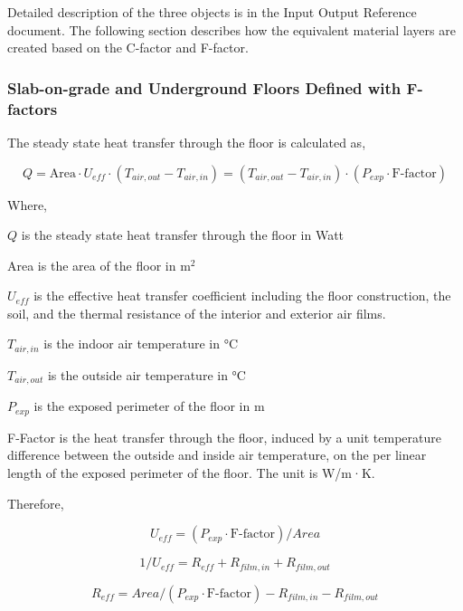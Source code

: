 Detailed description of the three objects is in the Input Output Reference document. The following section describes how the equivalent material layers are created based on the C-factor and F-factor.

\subsubsection{Slab-on-grade and Underground Floors Defined with F-factors}\label{slab-on-grade-and-underground-floors-defined-with-f-factors}

The steady state heat transfer through the floor is calculated as,

\begin{equation}
  Q = \text{Area} \cdot U_{eff} \cdot (T_{air,out} - T_{air,in}) = (T_{air,out} - T_{air,in}) \cdot (P_{exp} \cdot \text{F-factor})
\end{equation}

Where,

\(Q\) is the steady state heat transfer through the floor in Watt

Area is the area of the floor in m\(^{2}\)

\(U_{eff}\) is the effective heat transfer coefficient including the floor construction, the soil, and the thermal resistance of the interior and exterior air films.

\(T_{air,in}\) is the indoor air temperature in °C

\(T_{air,out}\) is the outside air temperature in °C

\(P_{exp}\) is the exposed perimeter of the floor in m

F-Factor is the heat transfer through the floor, induced by a unit temperature difference between the outside and inside air temperature, on the per linear length of the exposed perimeter of the floor. The unit is W/m·K.

Therefore,

\begin{equation}
U_{eff} = (P_{exp} \cdot \text{F-factor}) / Area
\end{equation}

\begin{equation}
1 / U_{eff} = R_{eff} + R_{film,in} + R_{film,out}
\end{equation}

\begin{equation}
R_{eff} = Area / (P_{exp} \cdot \text{F-factor}) - R_{film,in} - R_{film,out}
\end{equation}


